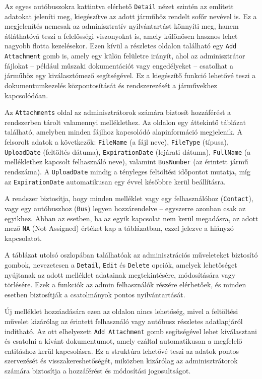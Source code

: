 Az egyes autóbuszokra kattintva elérhető \texttt{Detail} nézet szintén az említett adatokat jeleníti meg, kiegészítve az adott járműhöz rendelt sofőr nevével is. Ez a megjelenítés nemcsak az adminisztratív nyilvántartást könnyíti meg, hanem átláthatóvá teszi a felelősségi viszonyokat is, amely különösen hasznos lehet nagyobb flotta kezelésekor. Ezen kívül a részletes oldalon található egy \texttt{Add Attachment} gomb is, amely egy külön felületre irányít, ahol az adminisztrátor fájlokat – például műszaki dokumentációt vagy engedélyeket – csatolhat a járműhöz egy kiválasztómező segítségével. Ez a kiegészítő funkció lehetővé teszi a dokumentumkezelés központosítását és rendszerezését a járművekhez kapcsolódóan.

Az \texttt{Attachments} oldal az adminisztrátorok számára biztosít hozzáférést a rendszerben tárolt valamennyi melléklethez. Az oldalon egy áttekintő táblázat található, amelyben minden fájlhoz kapcsolódó alapinformáció megjelenik. A felsorolt adatok a következők: \texttt{FileName} (a fájl neve), \texttt{FileType} (típusa), \texttt{UploadDate} (feltöltés dátuma), \texttt{ExpirationDate} (lejárati dátuma), \texttt{FullName} (a melléklethez kapcsolt felhasználó neve), valamint \texttt{BusNumber} (az érintett jármű rendszáma). A \texttt{UploadDate} mindig a tényleges feltöltési időpontot mutatja, míg az \texttt{ExpirationDate} automatikusan egy évvel későbbre kerül beállításra.

A rendszer biztosítja, hogy minden melléklet vagy egy felhasználóhoz (\texttt{Contact}), vagy egy autóbuszhoz (\texttt{Bus}) legyen hozzárendelve – egyszerre azonban csak az egyikhez. Abban az esetben, ha az egyik kapcsolat nem kerül megadásra, az adott mező \texttt{NA} (Not Assigned) értéket kap a táblázatban, ezzel jelezve a hiányzó kapcsolatot.

A táblázat utolsó oszlopában találhatóak az adminisztrációs műveleteket biztosító gombok, nevezetesen a \texttt{Detail}, \texttt{Edit} és \texttt{Delete} opciók, amelyek lehetőséget nyújtanak az adott melléklet adatainak megtekintésére, módosítására vagy törlésére. Ezek a funkciók az admin felhasználók részére elérhetőek, és minden esetben biztosítják a csatolmányok pontos nyilvántartását.

Új melléklet hozzáadására ezen az oldalon nincs lehetőség, mivel a feltöltési művelet kizárólag az érintett felhasználó vagy autóbusz részletes adatlapjáról indítható. Az ott elhelyezett \texttt{Add Attachment} gomb segítségével lehet kiválasztani és csatolni a kívánt dokumentumot, amely ezáltal automatikusan a megfelelő entitáshoz kerül kapcsolásra. Ez a struktúra lehetővé teszi az adatok pontos szervezését és visszakereshetőségét, miközben kizárólag az adminisztrátorok számára biztosítja a hozzáférést és módosítási jogosultságot.

